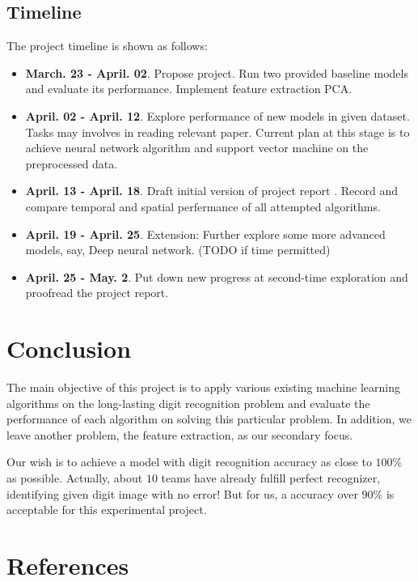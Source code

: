 \documentclass{article} %
\begin{document}
\subsection{Timeline}
The project timeline is shown as follows:
\begin{itemize}
    \item{\textbf{March. 23 - April. 02}. Propose project. Run two 
            provided baseline models and evaluate its performance. 
            Implement feature extraction PCA.}
    \item{\textbf{April. 02 - April. 12}. Explore performance of new models in
        given dataset. Tasks may involves in reading relevant paper. Current
        plan at this stage is to achieve neural network algorithm and
        support vector machine on the preprocessed data.}
    \item{\textbf{April. 13 - April. 18}. Draft initial version of project report
        . Record and compare temporal and spatial perfermance of all attempted algorithms. }
    \item{\textbf{April. 19 - April. 25}. Extension: Further explore some more advanced
            models, say, Deep neural network. (TODO if time permitted)}
    \item{\textbf{April. 25 - May. 2}. Put down new progress at second-time
            exploration and proofread the project report.}
\end{itemize}

\section{Conclusion} \label{Conclusion}
    The main objective of this project is to apply various existing machine
    learning algorithms on the long-lasting digit recognition problem and
    evaluate the performance of each algorithm on solving this particular
    problem.
    In addition, we leave another problem, the feature extraction, as our
    secondary focus. 
    
    Our wish is to achieve a model with digit recognition accuracy as close to
    $100\%$ as possible. Actually, about $10$ teams have already fulfill
    perfect recognizer, identifying given digit image with no error!  But for
    us, a accuracy over $90\%$ is acceptable for this experimental project.

\section{References}
\end{document}
